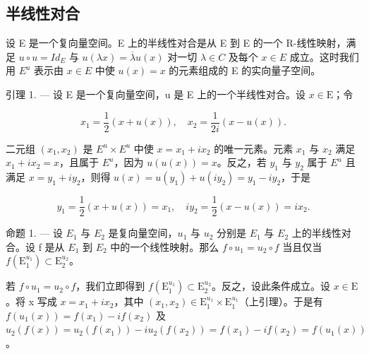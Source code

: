 \subsection{半线性对合}

设 E 是一个复向量空间。E 上的半线性对合是从 E 到 E 的一个 R-线性映射，满足 \(u \circ u = Id_{E}\) 与 \(u(\lambda x) = \overline{\lambda}u(x)\) 对一切 \(\lambda \in C\) 及每个 \(x \in E\) 成立。这时我们用 \(E^{u}\) 表示由 \(x \in E\) 中使 \(u(x) = x\) 的元素组成的 E 的实向量子空间。

引理 1. --- 设 E 是一个复向量空间，u 是 E 上的一个半线性对合。设 \(x \in \mathrm{E}\)；令

\[
x _ {1} = \frac {1}{2} (x + u (x)), \quad x _ {2} = \frac {1}{2 i} (x - u (x)).
\]

二元组 \((x_{1}, x_{2})\) 是 \(E^{u} \times E^{u}\) 中使 \(x = x_{1} + ix_{2}\) 的唯一元素。元素 \(x_{1}\) 与 \(x_{2}\) 满足 \(x_{1} + ix_{2} = x\)，且属于 \(E^{u}\)，因为 \(u(u(x)) = x\)。反之，若 \(y_{1}\) 与 \(y_{2}\) 属于 \(E^{u}\) 且满足 \(x = y_{1} + iy_{2}\)，则得 \(u(x) = u(y_{1}) + u(iy_{2}) = y_{1} - iy_{2}\)，于是

\[
y _ {1} = \frac {1}{2} (x + u (x)) = x _ {1}, \quad i y _ {2} = \frac {1}{2} (x - u (x)) = i x _ {2}.
\]

命题 1. --- 设 \(E_{1}\) 与 \(E_{2}\) 是复向量空间，\(u_{1}\) 与 \(u_{2}\) 分别是 \(E_{1}\) 与 \(E_{2}\) 上的半线性对合。设 f 是从 \(E_{1}\) 到 \(E_{2}\) 中的一个线性映射。那么 \(f \circ u_{1} = u_{2} \circ f\) 当且仅当 \(f(\mathrm{E}_{1}^{u_{1}}) \subset \mathrm{E}_{2}^{u_{2}}\)。

若 \(f \circ u_1 = u_2 \circ f\)，我们立即得到 \(f(\mathrm{E}_1^{u_1}) \subset \mathrm{E}_2^{u_2}\)。反之，设此条件成立。设 \(x \in \mathrm{E}\)。将 x 写成 \(x = x_1 + ix_2\)，其中 \((x_1, x_2) \in \mathrm{E}_1^{u_1} \times \mathrm{E}_1^{u_1}\)（上引理）。于是有 \(f(u_1(x)) = f(x_1) - if(x_2)\) 及 \(u_2(f(x)) = u_2(f(x_1)) - iu_2(f(x_2)) = f(x_1) - if(x_2) = f(u_1(x))\)。

